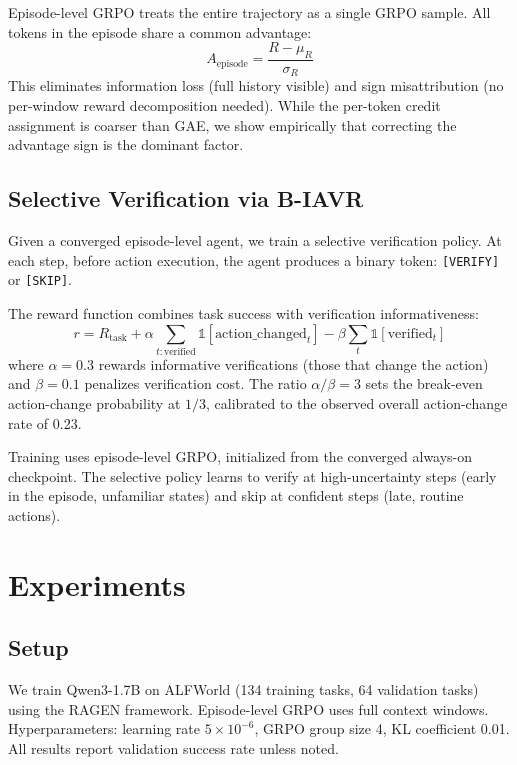 \documentclass[11pt]{article}
\begin{document}
Episode-level GRPO treats the entire trajectory as a single GRPO sample. All tokens in the episode share a common advantage:
\begin{equation}
A_{\text{episode}} = \frac{R - \mu_R}{\sigma_R}
\end{equation}
This eliminates information loss (full history visible) and sign misattribution (no per-window reward decomposition needed). While the per-token credit assignment is coarser than GAE, we show empirically that correcting the advantage sign is the dominant factor.

\subsection{Selective Verification via B-IAVR}

Given a converged episode-level agent, we train a selective verification policy. At each step, before action execution, the agent produces a binary token: \texttt{[VERIFY]} or \texttt{[SKIP]}.

The reward function combines task success with verification informativeness:
\begin{equation}
r = R_{\text{task}} + \alpha \sum_{t: \text{verified}} \mathbb{1}[\text{action\_changed}_t] - \beta \sum_{t} \mathbb{1}[\text{verified}_t]
\end{equation}
where $\alpha = 0.3$ rewards informative verifications (those that change the action) and $\beta = 0.1$ penalizes verification cost. The ratio $\alpha/\beta = 3$ sets the break-even action-change probability at $1/3$, calibrated to the observed overall action-change rate of 0.23.

Training uses episode-level GRPO, initialized from the converged always-on checkpoint. The selective policy learns to verify at high-uncertainty steps (early in the episode, unfamiliar states) and skip at confident steps (late, routine actions).

\section{Experiments}

\subsection{Setup}

We train Qwen3-1.7B on ALFWorld (134 training tasks, 64 validation tasks) using the RAGEN framework. Episode-level GRPO uses full context windows. Hyperparameters: learning rate $5 \times 10^{-6}$, GRPO group size 4, KL coefficient 0.01. All results report validation success rate unless noted.
\end{document}
